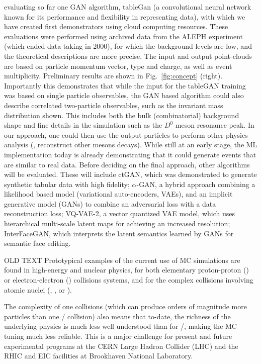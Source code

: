 evaluating so far one GAN algorithm, tableGan (a convolutional neural network known for its performance and flexibility in representing data), with which we have created first demonstrators using cloud computing resources. These evaluations were performed using {\eecol} archived data from the ALEPH experiment (which ended data taking in 2000), for which the background levels are low, and the theoretical descriptions are more precise. The input and output point-clouds are based on particle momentum vector,  type and charge, as well as event multiplicity. Preliminary results are shown in Fig.~\ref{fig:concept} (right). Importantly this demonstrates that while the input for the tableGAN training was based on single particle observables, the GAN based algorithm could also describe correlated two-particle observables, such as the invariant mass distribution shown. This includes both the bulk (combinatorial) background shape and fine details in the simulation such as the $D^0$ meson resonance peak. In our approach, one could then use the output particles to perform other physics analysis (\eg, reconstruct other mesons decays). While still at an early stage, the ML implementation today is already demonstrating that it could generate {\eecol} events that are similar to real data. Before deciding on the final approach, other algorithms will be evaluated. These will include ctGAN, which was demonstrated to generate synthetic tabular data with high fidelity; $\alpha$-GAN, a hybrid approach combining a likelihood based model (variational auto-encoders, VAEs), and an implicit generative model (GANs) to combine an adversarial loss with a data reconstruction loss; VQ-VAE-2, a vector quantized VAE model, which uses hierarchical multi-scale latent maps for achieving an increased resolution; InterFaceGAN, which interprets the latent semantics learned by GANs for semantic face editing. 


OLD TEXT
Prototypical examples of the current use of MC simulations are found in high-energy and nuclear physics, for both elementary proton-proton (\pp) or electron-electron (\eecol) collisions systems, and for the complex collisions involving atomic nuclei (\eA, \pA, or \aacol).  

The complexity of one {\aacol} collisions (which can produce orders of magnitude more particles than one \eecol/{\pp} collision) also means that to-date, the richness of the underlying physics is much less well understood than for \eecol/{\pp}, making the MC tuning much less reliable. This is a major challenge for present and future experimental programs at the CERN Large Hadron Collider (LHC) and the RHIC and EIC facilities at Brookhaven National Laboratory.


